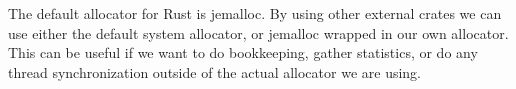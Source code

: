 The default allocator for Rust is jemalloc\cite{jemalloc}. By using other external crates we can
use either the default system allocator, or jemalloc wrapped in our own allocator. This can be
useful if we want to do bookkeeping, gather statistics, or do any thread synchronization outside of
the actual allocator we are using.

\begin{figure}[ht]

\end{figure}
